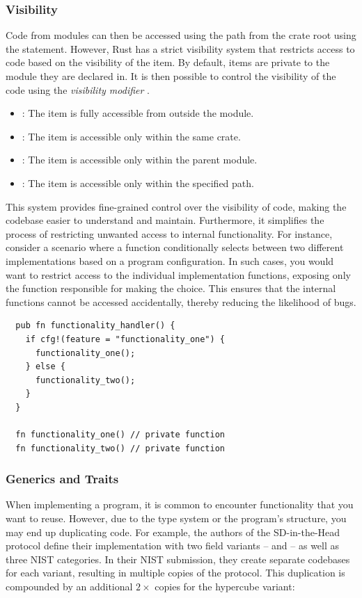 \documentclass[twoside,11pt]{report}
\theoremstyle{definition}
\theoremstyle{plain}
\begin{document}
\subsubsection*{Visibility} %
Code from modules can then be accessed using the path from the crate root using the  statement. However, Rust has a strict visibility system that restricts access to code based on the visibility of the item. By default, items are private to the module they are declared in. It is then possible to control the visibility of the code using the \textit{visibility modifier} .
\begin{itemize}[parsep=0pt, itemsep=0pt]
  \item {}: The item is fully accessible from outside the module.
  \item {}: The item is accessible only within the same crate.
  \item {}: The item is accessible only within the parent module.
  \item {}: The item is accessible only within the specified path.
\end{itemize}
This system provides fine-grained control over the visibility of code, making the codebase easier to understand and maintain. Furthermore, it simplifies the process of restricting unwanted access to internal functionality. For instance, consider a scenario where a function conditionally selects between two different implementations based on a program configuration. In such cases, you would want to restrict access to the individual implementation functions, exposing only the function responsible for making the choice. This ensures that the internal functions cannot be accessed accidentally, thereby reducing the likelihood of bugs.
\begin{verbatim}
  pub fn functionality_handler() {
    if cfg!(feature = "functionality_one") {
      functionality_one();
    } else {
      functionality_two();
    }
  }

  fn functionality_one() // private function
  fn functionality_two() // private function
\end{verbatim}

\subsubsection{Generics and Traits}

When implementing a program, it is common to encounter functionality that you want to reuse. However, due to the type system or the program's structure, you may end up duplicating code. For example, the authors of the SD-in-the-Head protocol define their implementation with two field variants --  and  -- as well as three NIST categories. In their NIST submission, they create separate codebases for each variant, resulting in multiple copies of the protocol. This duplication is compounded by an additional $2\times$ copies for the hypercube variant:
\end{document}
